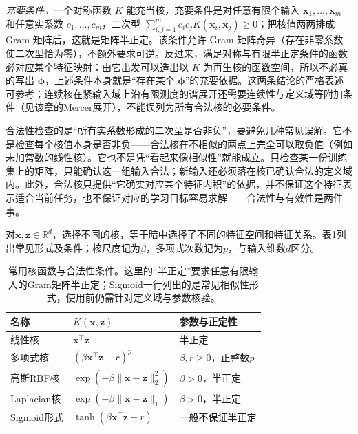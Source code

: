 \emph{充要条件。}一个对称函数 $K$ 能充当核，充要条件是对任意有限个输入 $\bm x_1,\ldots,\bm x_m$ 和任意实系数 $c_1,\ldots,c_m$，二次型 $\sum_{i,j=1}^m c_ic_jK(\bm x_i,\bm x_j)\ge0$；把核值两两排成 Gram 矩阵后，这就是矩阵半正定。该条件允许 Gram 矩阵奇异（存在非零系数使二次型恰为零），不额外要求可逆。反过来，满足对称与有限半正定条件的函数必对应某个特征映射：由它出发可以造出以 $K$ 为再生核的函数空间，所以不必真的写出 $\bm\phi$，上述条件本身就是“存在某个 $\bm\phi$”的充要依据。这两条结论的严格表述可参考；连续核在紧输入域上沿有限测度的谱展开还需要连续性与定义域等附加条件（见该章的Mercer展开），不能误列为所有合法核的必要条件。

合法性检查的是“所有实系数形成的二次型是否非负”，要避免几种常见误解。它不是检查每个核值本身是否非负——合法核在不相似的两点上完全可以取负值（例如未加常数的线性核）。它也不是凭“看起来像相似性”就能成立。只检查某一份训练集上的矩阵，只能确认这一组输入合法；新输入还必须落在核已确认合法的定义域内。此外，合法核只提供“它确实对应某个特征内积”的依据，并不保证这个特征表示适合当前任务，也不保证对应的学习目标容易求解——合法性与有效性是两件事。

对$\bm x,\bm z\in\mathbb R^d$，选择不同的核，等于暗中选择了不同的特征空间和特征关系。表\ref{tab:classic-overview-common-kernels}列出常见形式及条件；核尺度记为$\beta$，多项式次数记为$p$，与输入维数$d$区分。

\begin{table}[htbp]
  \centering
  \small
  \begin{tabularx}{\linewidth}{@{}>{\RaggedRight\arraybackslash}p{18mm}>{\RaggedRight\arraybackslash}X>{\RaggedRight\arraybackslash}p{27mm}@{}}
    \toprule
    名称 & $K(\bm{x},\bm{z})$ & 参数与正定性\\
    \midrule
    线性核 & $\bm{x}^{\top}\bm{z}$ & 半正定\\
    多项式核 & $(\beta\bm{x}^{\top}\bm{z}+r)^p$ & $\beta,r\ge0$，正整数$p$\\
    高斯RBF核 & $\exp(-\beta\lVert\bm{x}-\bm{z}\rVert_2^2)$ & $\beta>0$，半正定\\
    Laplacian核 & $\exp(-\beta\lVert\bm{x}-\bm{z}\rVert_1)$ & $\beta>0$，半正定\\
    Sigmoid形式 & $\tanh(\beta\bm{x}^{\top}\bm{z}+r)$ & 一般不保证半正定\\
    \bottomrule
  \end{tabularx}
  \caption{常用核函数与合法性条件。这里的“半正定”要求任意有限输入的Gram矩阵半正定；Sigmoid一行列出的是常见相似性形式，使用前仍需针对定义域与参数核验。}
  \label{tab:classic-overview-common-kernels}
\end{table}

